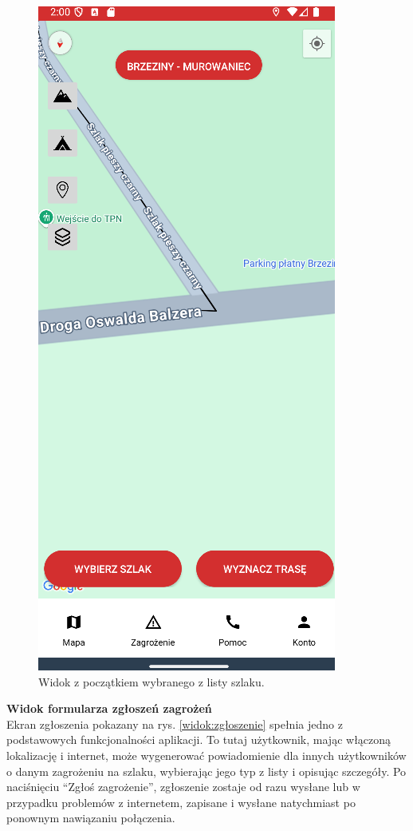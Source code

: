 \begin{figure}[H]
    \centering
    \includegraphics[scale=0.6]{img/imp/po-wyborze-z-listy.png}
    \caption{Widok z początkiem wybranego z listy szlaku.}
    \label{widok:szlak}
\end{figure}

\textbf{Widok formularza zgłoszeń zagrożeń} \\
\indent Ekran zgłoszenia pokazany na rys. \ref{widok:zgłoszenie} spełnia jedno z podstawowych funkcjonalności aplikacji. To tutaj użytkownik, mając włączoną lokalizację i internet, może wygenerować powiadomienie dla innych użytkowników o danym zagrożeniu na szlaku, wybierając jego typ z listy i opisując szczegóły. Po naciśnięciu “Zgłoś zagrożenie”, zgłoszenie zostaje od razu wysłane lub w przypadku problemów z internetem, zapisane i wysłane natychmiast po ponownym nawiązaniu połączenia.

